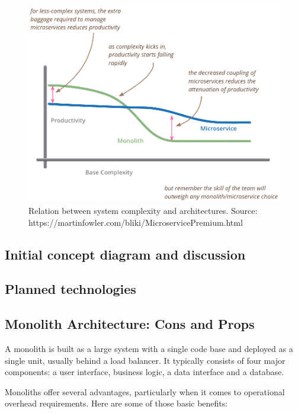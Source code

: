 \begin{figure}[H]
    \centering
    \includegraphics[width=1\textwidth]{monolith_vs_microservice}
    \caption{Relation between system complexity and architectures. Source: https://martinfowler.com/bliki/MicroservicePremium.html}
    \label{fig:monolith_vs_microservice}
\end{figure}

\subsection{Initial concept diagram and discussion}\label{subsec:initial-concept-diagram}

\subsection{Planned technologies}\label{subsec:planned-technologies}

\subsection{Monolith Architecture: Cons and Props}\label{subsec:monolith-architecture:-cons-and-props}

A monolith is built as a large system with a single code base and deployed as a single unit, usually behind a load balancer.
It typically consists of four major components: a user interface, business logic, a data interface and a database.

Monoliths offer several advantages, particularly when it comes to operational overhead requirements.
Here are some of those basic benefits:

